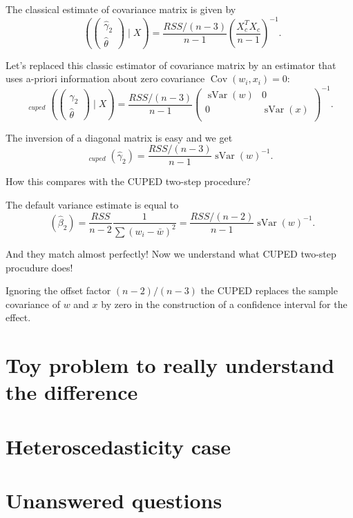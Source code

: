 \documentclass[10pt, a4paper]{article}
\DeclareMathOperator{\Var}{Var}
\DeclareMathOperator{\sVar}{sVar}
\DeclareMathOperator{\hVar}{\widehat{\Var}}
\DeclareMathOperator{\Cov}{Cov}
\begin{document}
The classical estimate of covariance matrix is given by 
\[
\hVar\left( 
    \begin{pmatrix}    
        \hat \gamma_2 \\
        \hat \theta
    \end{pmatrix}
    \mid X \right) = 
\frac{RSS/(n-3)}{n-1} \left(\frac{X_c^TX_c}{n-1}\right)^{-1}.
\]

Let's replaced this classic estimator of covariance matrix by an estimator that uses a-priori information 
about zero covariance $\Cov(w_i, x_i) = 0$:
\[
\hVar_{cuped}\left( 
    \begin{pmatrix}    
        \hat \gamma_2 \\
        \hat \theta
    \end{pmatrix}
    \mid X \right) = 
\frac{RSS/(n-3)}{n-1} 
\begin{pmatrix}
\sVar(w) & 0 \\
0 & \sVar(x) \\
\end{pmatrix}
^{-1}.
\]

The inversion of a diagonal matrix is easy and we get
\[
\hVar_{cuped}(\hat\gamma_2) = \frac{RSS/(n-3)}{n-1} \sVar(w)^{-1}.    
\]


How this compares with the CUPED two-step procedure?

The default variance estimate is equal to
\[
    \hVar(\hat\beta_2) = \frac{RSS}{n-2} \frac{1}{\sum (w_i - \bar w)^2} = \frac{RSS/(n-2)}{n-1} \sVar(w)^{-1}.
\]

And they match almost perfectly! Now we understand what CUPED two-step procudure does!

Ignoring the offset factor $(n-2)/(n-3)$ the CUPED replaces the sample 
covariance of $w$ and $x$ by zero in the construction of a confidence interval for the effect. 


\section{Toy problem to really understand the difference}




\section{Heteroscedasticity case}


\section{Unanswered questions}
\end{document}
